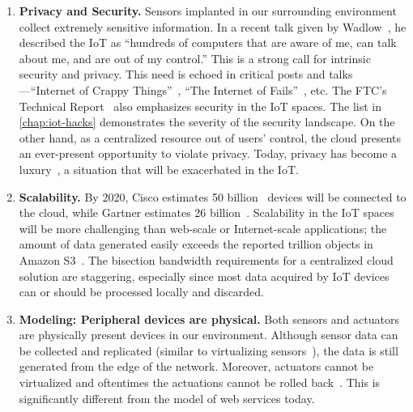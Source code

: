 \begin{enumerate}

\item \textbf{Privacy and Security.} Sensors implanted in our surrounding
  environment collect extremely sensitive information.  In a recent talk given
  by Wadlow~\cite{wadlow}, he described the IoT as ``hundreds of computers that
  are aware of me, can talk about me, and are out of my control.''  This is a
  strong call for intrinsic security and privacy.  This need is echoed in
  critical posts and talks---``Internet of Crappy
  Things''~\cite{alex2015internet}, ``The Internet of
  Fails''~\cite{stanislav2014the}, etc.  The FTC's Technical
  Report~\cite{ftc2015internet} also emphasizes security in the IoT spaces.  The
  list in \autoref{chap:iot-hacks} demonstrates the severity of the security
  landscape. On the other hand, as a centralized resource out of users' control,
  the cloud presents an ever-present opportunity to violate privacy.  Today,
  privacy has become a luxury~\cite{angwin2014has}, a situation that will be
  exacerbated in the IoT.

\item \textbf{Scalability.} By 2020, Cisco estimates 50
  billion~\cite{evans2011internet} devices will be connected to the cloud, while
  Gartner estimates 26 billion~\cite{middleton2013forecast}. Scalability in the
  IoT spaces will be more challenging than web-scale or Internet-scale
  applications; the amount of data generated easily exceeds the reported
  trillion objects in Amazon S3~\cite{barr2013amazon}. The bisection bandwidth
  requirements for a centralized cloud solution are staggering, especially since
  most data acquired by IoT devices can or should be processed locally and
  discarded.

\item \textbf{Modeling: Peripheral devices are physical.}  Both sensors and
  actuators are physically present devices in our environment.  Although sensor
  data can be collected and replicated (similar to virtualizing
  sensors~\cite{yuriyama2010sensor}), the data is still generated from the edge
  of the network.  Moreover, actuators cannot be virtualized and oftentimes the
  actuations cannot be rolled back~\cite{dawson2013boss}. This is significantly
  different from the model of web services today.


\end{enumerate}
